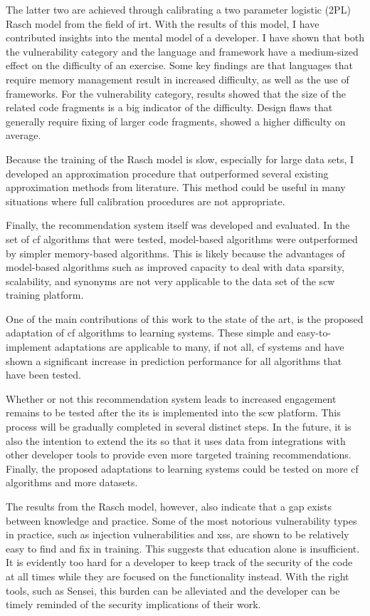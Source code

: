 The latter two are achieved through calibrating a two parameter logistic (2PL) Rasch model from the field of \gls{irt}.
With the results of this model, I have contributed insights into the mental model of a developer.
I have shown that both the vulnerability category and the language and framework have a medium-sized effect on the difficulty of an exercise.
Some key findings are that languages that require memory management result in increased difficulty, as well as the use of frameworks.
For the vulnerability category, results showed that the size of the related code fragments is a big indicator of the difficulty.
Design flaws that generally require fixing of larger code fragments, showed a higher difficulty on average.

Because the training of the Rasch model is slow, especially for large data sets, I developed an approximation procedure that outperformed several existing approximation methods from literature.
This method could be useful in many situations where full calibration procedures are not appropriate.

Finally, the recommendation system itself was developed and evaluated.
In the set of \gls{cf} algorithms that were tested, model-based algorithms were outperformed by simpler memory-based algorithms.
This is likely because the advantages of model-based algorithms such as improved capacity to deal with data sparsity, scalability, and synonyms are not very applicable to the data set of the \gls{scw} training platform.

One of the main contributions of this work to the state of the art, is the proposed adaptation of \gls{cf} algorithms to learning systems.
These simple and easy-to-implement adaptations are applicable to many, if not all, \gls{cf} systems and have shown a significant increase in prediction performance for all algorithms that have been tested.

Whether or not this recommendation system leads to increased engagement remains to be tested after the \gls{its} is implemented into the \gls{scw} platform.
This process will be gradually completed in several distinct steps.
In the future, it is also the intention to extend the \gls{its} so that it uses data from integrations with other developer tools to provide even more targeted training recommendations.
Finally, the proposed adaptations to learning systems could be tested on more \gls{cf} algorithms and more datasets. 

The results from the Rasch model, however, also indicate that a gap exists between knowledge and practice.
Some of the most notorious vulnerability types in practice, such as injection vulnerabilities and \gls{xss}, are shown to be relatively easy to find and fix in training.
This suggests that education alone is insufficient.
It is evidently too hard for a developer to keep track of the security of the code at all times while they are focused on the functionality instead.
With the right tools, such as Sensei, this burden can be alleviated and the developer can be timely reminded of the security implications of their work.

